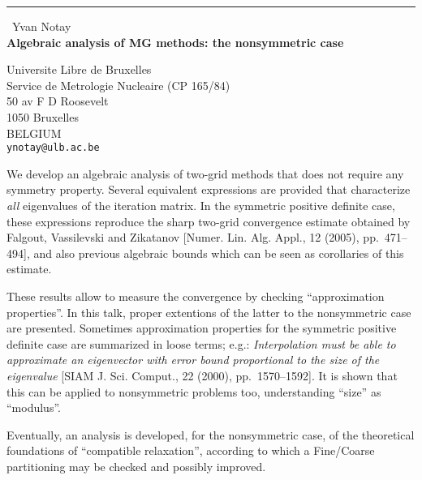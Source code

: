 \documentclass{report}
\begin{document}
\begin{center}
\rule{6in}{1pt} \
{\large Yvan Notay \\
{\bf Algebraic analysis of MG methods: the nonsymmetric case}}

Universite Libre de Bruxelles \\ Service de Metrologie Nucleaire (CP 165/84) \\ 50 av F D Roosevelt \\ 1050 Bruxelles \\ BELGIUM
\\
{\tt ynotay@ulb.ac.be}\end{center}

We develop an algebraic analysis of two-grid methods that does
not require any symmetry property. Several equivalent expressions are provided
that characterize {\em all} eigenvalues of the iteration matrix. In the
symmetric positive definite case, these expressions reproduce the
sharp two-grid convergence estimate obtained by Falgout, Vassilevski and
Zikatanov [Numer. Lin. Alg. Appl., 12 (2005), pp.~471--494], and also
previous algebraic bounds
which can be seen as corollaries of this estimate.

These results allow to measure the convergence by checking ``approximation
properties''. In this talk, proper extentions of the latter
to the nonsymmetric case are presented. Sometimes approximation properties
for the symmetric positive definite case are summarized in
loose terms; e.g.: {\em Interpolation must be
able to approximate an eigenvector with error bound proportional to the size
of the eigenvalue} [SIAM J. Sci. Comput., 22 (2000),
pp.~1570--1592]. It is shown that this can be applied
to nonsymmetric problems too,
understanding ``size'' as ``modulus''.

Eventually, an analysis is developed, for the nonsymmetric case, of
the theoretical
foundations of ``compatible relaxation'', according to which a
Fine/Coarse partitioning may be checked
and possibly improved.
\end{document}
